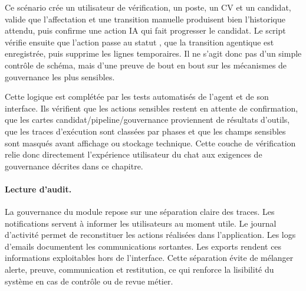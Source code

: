 Ce scénario crée un utilisateur de vérification, un poste, un CV et un candidat, valide que l'affectation et une transition manuelle produisent bien l'historique attendu, puis confirme une action IA qui fait progresser le candidat. Le script vérifie ensuite que l'action passe au statut , que la transition agentique est enregistrée, puis supprime les lignes temporaires. Il ne s'agit donc pas d'un simple contrôle de schéma, mais d'une preuve de bout en bout sur les mécanismes de gouvernance les plus sensibles.

Cette logique est complétée par les tests automatisés de l'agent et de son interface. Ils vérifient que les actions sensibles restent en attente de confirmation, que les cartes candidat/pipeline/gouvernance proviennent de résultats d'outils, que les traces d'exécution sont classées par phases et que les champs sensibles sont masqués avant affichage ou stockage technique. Cette couche de vérification relie donc directement l'expérience utilisateur du chat aux exigences de gouvernance décrites dans ce chapitre.

\paragraph{Lecture d'audit.}
La gouvernance du module repose sur une séparation claire des traces. Les notifications servent à informer les utilisateurs au moment utile. Le journal d'activité permet de reconstituer les actions réalisées dans l'application. Les logs d'emails documentent les communications sortantes. Les exports rendent ces informations exploitables hors de l'interface. Cette séparation évite de mélanger alerte, preuve, communication et restitution, ce qui renforce la lisibilité du système en cas de contrôle ou de revue métier.

